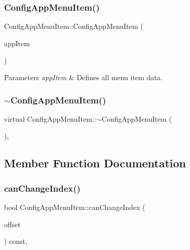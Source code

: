 \subsubsection{\texorpdfstring{Config\+App\+Menu\+Item()}{ConfigAppMenuItem()}}
{\footnotesize\ttfamily Config\+App\+Menu\+Item\+::\+Config\+App\+Menu\+Item (\begin{DoxyParamCaption}\item[{const \mbox{\hyperlink{structAppConfigFile_1_1AppItem}{App\+Config\+File\+::\+App\+Item}} \&}]{app\+Item }\end{DoxyParamCaption})}


\begin{DoxyParams}{Parameters}
{\em app\+Item} & Defines all menu item data. \\
\hline
\end{DoxyParams}
\mbox{\label{classConfigAppMenuItem_ab8485e4ace7e6418dc857d08bd570bc7}} 
\subsubsection{\texorpdfstring{$\sim$\+Config\+App\+Menu\+Item()}{~ConfigAppMenuItem()}}
{\footnotesize\ttfamily virtual Config\+App\+Menu\+Item\+::$\sim$\+Config\+App\+Menu\+Item (\begin{DoxyParamCaption}{ }\end{DoxyParamCaption})\hspace{0.3cm}{\ttfamily [inline]}, {\ttfamily [virtual]}}



\subsection{Member Function Documentation}
\mbox{\label{classConfigAppMenuItem_a6a65535f73a82a093217843240ba7496}} 
\subsubsection{\texorpdfstring{can\+Change\+Index()}{canChangeIndex()}}
{\footnotesize\ttfamily bool Config\+App\+Menu\+Item\+::can\+Change\+Index (\begin{DoxyParamCaption}\item[{int}]{offset }\end{DoxyParamCaption}) const\hspace{0.3cm}{\ttfamily [override]}, {\ttfamily [virtual]}}

